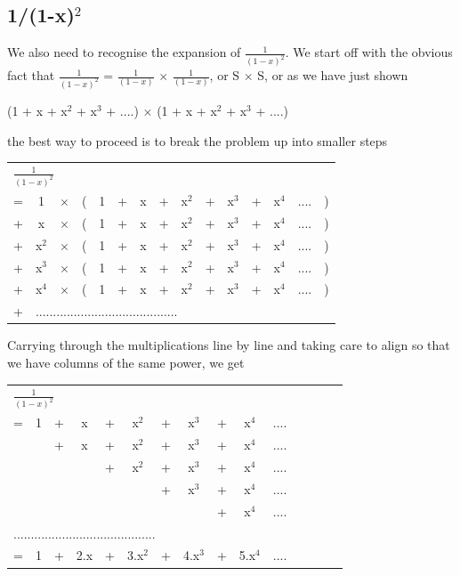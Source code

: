 \newpage



\subsection{1/(1-x)$^2$}

We also need to recognise the expansion of $\frac{1}{(1-x)^2}$.
We start off with the obvious fact that $\frac{1}{(1-x)^2}$
= $\frac{1}{(1-x)}$ $\times$ $\frac{1}{(1-x)}$, or S $\times$ S,
or as we have just shown 

\begin{center}
(1 + x + x$^2$ + x$^3$ + ....) $\times$ (1 + x + x$^2$ + x$^3$ + ....)
\end{center}

\noindent
the best way to proceed is to break the problem up into smaller steps


\begin{tabular}{r cc cc cc cc cc cc cc}
\multicolumn{10}{l}{$\frac{1}{(1-x)^2}$} \\
=  & 1 & $\times$ &(& 1 & + & x & + & x$^2$ & + & x$^3$ & + & x$^4$ &
  .... &)\\
+  & x & $\times$ &(& 1 & + & x & + & x$^2$ & + & x$^3$ & + & x$^4$ &
  .... &)\\
+  & x$^2$ & $\times$ &(& 1 & + & x & + & x$^2$ & + & x$^3$ & + &
  x$^4$ & .... &)\\
+  & x$^3$ & $\times$ &(& 1 & + & x & + & x$^2$ & + & x$^3$ & + & x$^4$ & .... &)\\
+  & x$^4$ & $\times$ &(& 1 & + & x & + & x$^2$ & + & x$^3$ & + &
  x$^4$ & .... &)\\
+ & \multicolumn{10}{l}{.........................................}\\
\end{tabular}

\noindent
Carrying through the multiplications line by line and taking care to
align so that we have columns of the same power, we get 

\begin{tabular}{r cc cc cc cc cc cc cc}
\multicolumn{10}{l}{$\frac{1}{(1-x)^2}$} \\
=  & 1 & + & x & + & x$^2$ & + & x$^3$ & + & x$^4$ &  .... &\\
   &   & + & x & + & x$^2$ & + & x$^3$ & + & x$^4$ &  .... &\\
   &   &   &   & + & x$^2$ & + & x$^3$ & + & x$^4$ &  .... &\\
   &   &   &   &   &       & + & x$^3$ & + & x$^4$ &  .... &\\
   &   &   &   &   &       &   &       & + & x$^4$ &  .... &\\
\multicolumn{10}{l}{.........................................}\\
\hline
= &  1 & + & 2.x & + & 3.x$^2$ & + & 4.x$^3$ & + & 5.x$^4$ &  .... &\\
\hline
\end{tabular}

